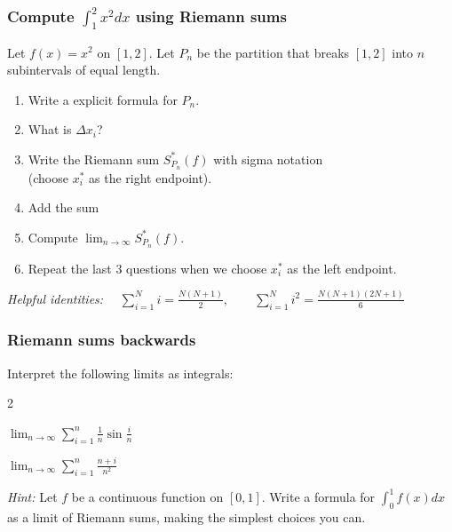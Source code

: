 \documentclass[14pt]{beamer}
\begin{document}
\begin{frame}[t]
	\fontsize{13}{13}\selectfont
	\frametitle{Compute $\displaystyle \int_{1}^{2}\! x^{2}dx$ using Riemann sums}

	\begin{block}{}
		Let $\displaystyle f(x) = x^{2}$ on $[1,2]$. Let $P_{n}$ be the partition
		that breaks $[1,2]$ into $n$ subintervals of equal length.
		\begin{enumerate}
			\item Write a explicit formula for $P_{n}$.

			\item What is $\Delta x_{i}$?

			\item Write the Riemann sum $\displaystyle S^{*}_{P_n}(f)$ with sigma notation
				\\ (choose $x^{*}_{i}$ as the right endpoint).

			\item Add the sum

			\item Compute $\displaystyle \lim_{n \to \infty}S^{*}_{P_n}(f)$.

			\item Repeat the last 3 questions when we choose $x^{*}_{i}$ as the left endpoint.
		\end{enumerate}
	\end{block}
	{\fontsize{10}{10}\selectfont \emph{Helpful identities:} $\displaystyle \quad \sum_{i=1}^{N}i = \frac{N(N+1)}{2}, \quad \quad \sum_{i=1}^{N}i^{2}= \frac{N(N+1)(2N+1)}{6}$ }
\end{frame}

\begin{frame}[t]
	\frametitle{Riemann sums backwards}

	Interpret the following limits as integrals:
	\begin{enumerate}
	\end{enumerate}
	{\fontsize{10}{10}\selectfont \emph{Hint:} Let $f$ be a continuous function on $[0,1]$. Write a formula for $\displaystyle \int_{0}^{1}f(x) dx$ as a limit of Riemann sums, making the simplest choices you can. }
\end{frame}
\end{document}

